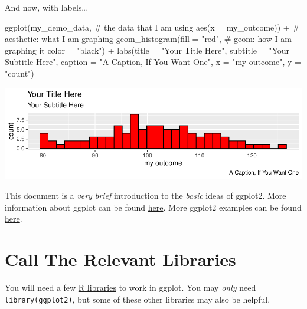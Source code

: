 \documentclass[12pt,]{article}
\newenvironment{Shaded}{}{}
\newcommand{\CommentTok}[1]{\textcolor[rgb]{0.00,0.50,0.00}{#1}}
\newcommand{\DataTypeTok}[1]{#1}
\newcommand{\KeywordTok}[1]{\textcolor[rgb]{0.00,0.00,1.00}{#1}}
\newcommand{\NormalTok}[1]{#1}
\newcommand{\OperatorTok}[1]{#1}
\newcommand{\StringTok}[1]{\textcolor[rgb]{0.00,0.50,0.50}{#1}}
\begin{document}
And now, with labels\ldots{}

\begin{Shaded}
\begin{Highlighting}[]
\KeywordTok{ggplot}\NormalTok{(my_demo_data, }\CommentTok{# the data that I am using}
       \KeywordTok{aes}\NormalTok{(}\DataTypeTok{x =}\NormalTok{ my_outcome)) }\OperatorTok{+}\StringTok{ }\CommentTok{# aesthetic: what I am graphing}
\StringTok{  }\KeywordTok{geom_histogram}\NormalTok{(}\DataTypeTok{fill =} \StringTok{"red"}\NormalTok{, }\CommentTok{# geom: how I am graphing it}
                 \DataTypeTok{color =} \StringTok{"black"}\NormalTok{) }\OperatorTok{+}
\StringTok{  }\KeywordTok{labs}\NormalTok{(}\DataTypeTok{title =} \StringTok{"Your Title Here"}\NormalTok{,}
       \DataTypeTok{subtitle =} \StringTok{"Your Subtitle Here"}\NormalTok{,}
       \DataTypeTok{caption =} \StringTok{"A Caption, If You Want One"}\NormalTok{,}
       \DataTypeTok{x =} \StringTok{"my outcome"}\NormalTok{,}
       \DataTypeTok{y =} \StringTok{"count"}\NormalTok{)}
\end{Highlighting}
\end{Shaded}

\includegraphics{introduction-to-ggplot2_files/figure-latex/unnamed-chunk-4-1.pdf}

This document is a \emph{very brief} introduction to the \emph{basic}
ideas of ggplot2. More information about ggplot can be found
\href{http://ggplot2.org/}{here}. More ggplot2 examples can be found
\href{http://www-personal.umich.edu/~agrogan/how_to_choose_a_chart/how_to_choose_a_chart_v3.html}{here}.

\hypertarget{call-the-relevant-libraries}{%
\section{Call The Relevant
Libraries}\label{call-the-relevant-libraries}}

You will need a few
\href{http://www-personal.umich.edu/~agrogan/R/introduction-to-R.html\#2_base_r_and_libraries}{R
libraries} to work in ggplot. You may \emph{only} need
\texttt{library(ggplot2)}, but some of these other libraries may also be
helpful.
\end{document}
